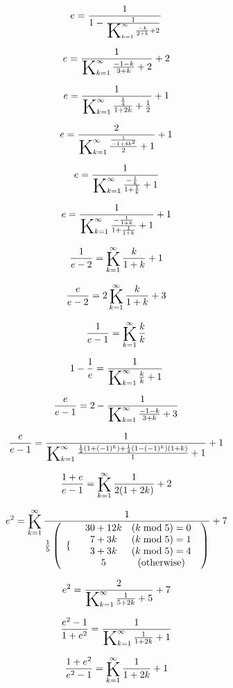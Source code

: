 \documentclass{article}
\newcommand{\bigK}{\mathop{\raisebox{-5pt}{\huge K}}}
\begin{document}
\[e=\frac{1}{1-\frac{1}{\bigK_{k=1}^{\infty}\frac{-k}{2+k}+2}}\] 

\[e=\frac{1}{\bigK_{k=1}^{\infty}\frac{-1-k}{3+k}+2}+2\] 

\[e=\frac{1}{\bigK_{k=1}^{\infty}\frac{\frac{1}{4}}{1+2 k}+\frac{1}{2}}+1\] 

\[e=\frac{2}{\bigK_{k=1}^{\infty}\frac{\frac{1}{-1+4 k^2}}{2}+1}+1\] 

\[e=\frac{1}{\bigK_{k=1}^{\infty}\frac{-\frac{1}{k}}{1+\frac{1}{k}}+1}\] 

\[e=\frac{1}{\bigK_{k=1}^{\infty}\frac{-\frac{1}{1+k}}{1+\frac{1}{1+k}}+1}+1\] 

\[\frac{1}{e-2}=\bigK_{k=1}^{\infty}\frac{k}{1+k}+1\] 

\[\frac{e}{e-2}=2 \bigK_{k=1}^{\infty}\frac{k}{1+k}+3\] 

\[\frac{1}{e-1}=\bigK_{k=1}^{\infty}\frac{k}{k}\] 

\[1-\frac{1}{e}=\frac{1}{\bigK_{k=1}^{\infty}\frac{k}{k}+1}\] 

\[\frac{e}{e-1}=2-\frac{1}{\bigK_{k=1}^{\infty}\frac{-1-k}{3+k}+3}\] 

\[\frac{e}{e-1}=\frac{1}{\bigK_{k=1}^{\infty}\frac{\frac{1}{2} \left(1+(-1)^k\right)+\frac{1}{4} \left(1-(-1)^k\right) (1+k)}{1}+1}+1\] 

\[\frac{1+e}{e-1}=\bigK_{k=1}^{\infty}\frac{1}{2 (1+2 k)}+2\] 

\[e^2=\bigK_{k=1}^{\infty}\frac{1}{\frac{1}{5} \left( \begin{array}{cc}  \{ &  \begin{array}{cc}  30+12 k & (k \bmod 5)=0 \\  7+3 k & (k \bmod 5)=1 \\  3+3 k & (k \bmod 5)=4 \\  5 & (\text{otherwise}) \\ \end{array}  \\ \end{array} \right)}+7\] 

\[e^2=\frac{2}{\bigK_{k=1}^{\infty}\frac{1}{5+2 k}+5}+7\] 

\[\frac{e^2-1}{1+e^2}=\frac{1}{\bigK_{k=1}^{\infty}\frac{1}{1+2 k}+1}\] 

\[\frac{1+e^2}{e^2-1}=\bigK_{k=1}^{\infty}\frac{1}{1+2 k}+1\] 
\end{document}
